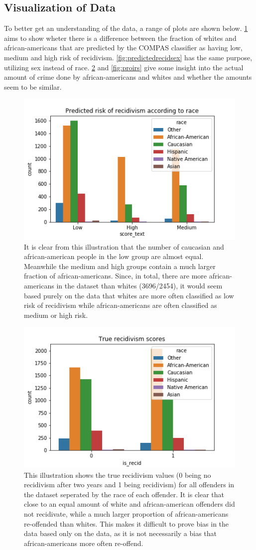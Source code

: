 \documentclass[11pt, fleqn, titlepage]{article}
\begin{document}
	\subsection{Visualization of Data} \label{dataVisuals}
	To better get an understanding of the data, a range of plots are shown below. \ref{fig:predictedrecidrace} aims to show wheter there is a difference between the fraction of whites and african-americans that are predicted by the COMPAS classifier as having low, medium and high risk of recidivism. \ref{fig:predictedrecidsex} has the same purpose, utilizing sex instead of race. \ref{fig:truerecid} and \ref{fig:proirs} give some insight into the actual amount of crime done by african-americans and whites and whether the amounts seem to be similar.
	
	\begin{figure}[H]
		\centering
		\includegraphics[width=0.5\linewidth]{imgs/predicted_recid_race}
		\caption{It is clear from this illustration that the number of caucasian and african-american people in the low group are almost equal. Meanwhile the medium and high groups contain a much larger fraction of african-americans. Since, in total, there are more african-americans in the dataset than whites (3696/2454), it would seem based purely on the data that whites are more often classified as low risk of recidivism while african-americans are often classified as medium or high risk.}
		\label{fig:predictedrecidrace}
	\end{figure}
	
	\begin{figure}[H]
		\centering
		\includegraphics[width=0.5\linewidth]{imgs/true_recid}
		\caption{This illustration shows the true recidivism values (0 being no recidivism after two years and 1 being recidivism) for all offenders in the dataset seperated by the race of each offender. It is clear that close to an equal amount of white and african-american offenders did not recidivate, while a much larger proportion of african-americans re-offended than whites. This makes it difficult to prove bias in the data based only on the data, as it is not necessarily a bias that african-americans more often re-offend.}
		\label{fig:truerecid}
	\end{figure}
	
\end{document}

